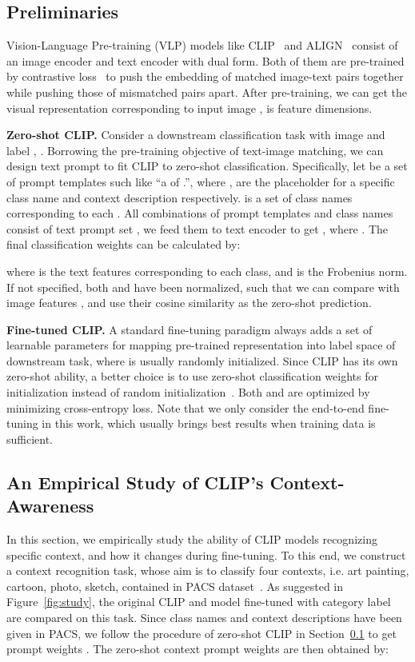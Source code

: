 \documentclass[pdflatex,sn-basic,iicol]{sn-jnl}
\theoremstyle{thmstyleone}\newtheorem{theorem}{Theorem}\newtheorem{proposition}[theorem]{Proposition}
\theoremstyle{thmstyletwo}\newtheorem{example}{Example}\newtheorem{remark}{Remark}
\theoremstyle{thmstylethree}\newtheorem{definition}{Definition}
\begin{document}
\subsection{Preliminaries} \label{sec:pre}
Vision-Language Pre-training (VLP) models like CLIP~\citep{radford2021learning} and ALIGN~\citep{jia2021scaling} consist of an image encoder  and text encoder  with dual form. Both of them are pre-trained by contrastive loss~\citep{hadsell2006dimensionality} to push the embedding of matched image-text pairs together while pushing those of mismatched pairs apart. After pre-training, we can get the visual representation  corresponding to input image ,  is feature dimensions. 

\noindent\textbf{Zero-shot CLIP.} Consider a downstream classification task with image  and label , . Borrowing the pre-training objective of text-image matching, we can design text prompt to fit CLIP to zero-shot classification. Specifically, let  be a set of prompt templates such like ``a  of .'', where ,  are the placeholder for a specific class name and context description respectively.  is a set of class names corresponding to each . All combinations of prompt templates and class names consist of text prompt set , we feed them to text encoder to get , where . The final classification weights can be calculated by: 

where  is the text features corresponding to each class, and  is the Frobenius norm. If not specified, both  and  have been normalized, such that we can compare  with image features , and use their cosine similarity  as the zero-shot prediction.

\noindent\textbf{Fine-tuned CLIP.} A standard fine-tuning paradigm always adds a set of learnable parameters  for mapping pre-trained representation into label space of downstream task, where  is usually randomly initialized. Since CLIP has its own zero-shot ability, a better choice is to use zero-shot classification weights  for initialization instead of random initialization~\citep{wortsman2022robust,wortsman2022model}. Both  and  are optimized by minimizing cross-entropy loss. Note that we only consider the end-to-end fine-tuning in this work, which usually brings best results when training data is sufficient.

\subsection{An Empirical Study of CLIP's Context-Awareness} \label{sec:context_study}
In this section, we empirically study the ability of CLIP models recognizing specific context, and how it changes during fine-tuning. To this end, we construct a context recognition task, whose aim is to classify four contexts, i.e. art painting, cartoon, photo, sketch, contained in PACS dataset~\citep{li2017deeper}. As suggested in Figure~\ref{fig:study}, the original CLIP  and model  fine-tuned with category label are compared on this task. Since class names and context descriptions have been given in PACS, we follow the procedure of zero-shot CLIP in Section~\ref{sec:pre} to get prompt weights . The zero-shot context prompt weights are then obtained by:
\end{document}

